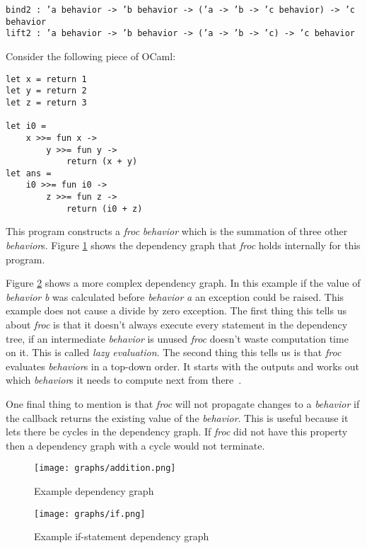 \texttt{bind2 : 'a behavior -> 'b behavior -> ('a -> 'b -> 'c behavior) -> 'c behavior}\\
\texttt{lift2 : 'a behavior -> 'b behavior -> ('a -> 'b -> 'c) -> 'c behavior}

Consider the following piece of OCaml:

\begin{lstlisting}[caption={Example with \emph{froc} \texttt{bind} (\texttt{\textgreater\textgreater=})}]
let x = return 1
let y = return 2
let z = return 3

let i0 =
    x >>= fun x ->
        y >>= fun y ->
            return (x + y)
let ans =
    i0 >>= fun i0 ->
        z >>= fun z ->
            return (i0 + z)
\end{lstlisting}

This program constructs a \emph{froc} \emph{behavior} which is the summation of three other \emph{behavior}s. Figure \ref{add_graph} shows the dependency graph that \emph{froc} holds internally for this program.

Figure \ref{if_graph} shows a more complex dependency graph. In this example if the value of \emph{behavior} \emph{b} was calculated before \emph{behavior} \emph{a} an exception could be raised. This example does not cause a divide by zero exception. The first thing this tells us about \emph{froc} is that it doesn't always execute every statement in the dependency tree, if an intermediate \emph{behavior} is unused \emph{froc} doesn't waste computation time on it. This is called \emph{lazy evaluation}. The second thing this tells us is that \emph{froc} evaluates \emph{behavior}s in a top-down order. It starts with the outputs and works out which \emph{behavior}s it needs to compute next from there~\cite{bib:froc}.

One final thing to mention is that \emph{froc} will not propagate changes to a \emph{behavior} if the callback returns the existing value of the \emph{behavior}. This is useful because it lets there be cycles in the dependency graph. If \emph{froc} did not have this property then a dependency graph with a cycle would not terminate.

\begin{figure}
  \centering
  \texttt{[image: graphs/addition.png]}
  \caption{Example dependency graph}
  \label{add_graph}
\end{figure}

\begin{figure}
  \centering
  \texttt{[image: graphs/if.png]}
  \caption{Example if-statement dependency graph}
  \label{if_graph}
\end{figure}

